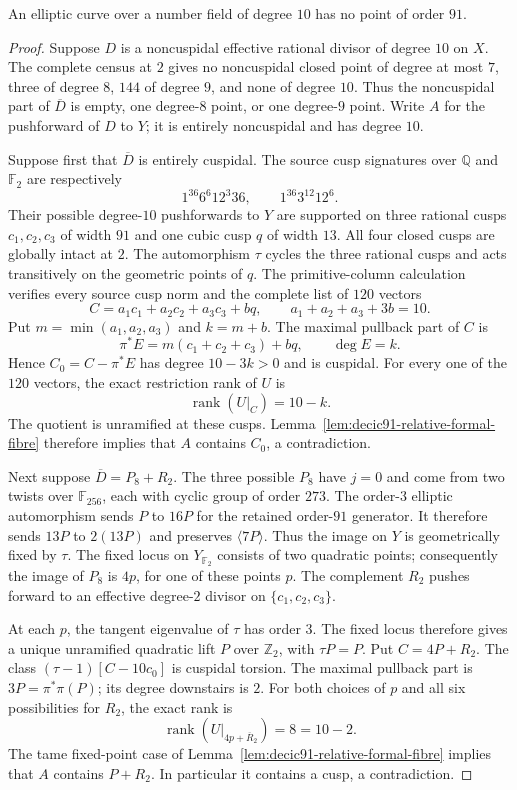 \begin{proposition}\label{prop:decic91-exclusion}
An elliptic curve over a number field of degree $10$ has no point of order $91$.
\end{proposition}
\begin{proof}
Suppose $D$ is a noncuspidal effective rational divisor of degree $10$ on $X$.
The complete census at $2$ gives no noncuspidal closed point of degree at most $7$,
three of degree $8$, $144$ of degree $9$, and none of degree $10$.
Thus the noncuspidal part of $\overline D$ is empty, one degree-$8$ point,
or one degree-$9$ point.
Write $A$ for the pushforward of $D$ to $Y$; it is entirely noncuspidal and has degree $10$.

Suppose first that $\overline D$ is entirely cuspidal.
The source cusp signatures over $\mathbb Q$ and $\mathbb F_2$ are respectively
\[
 1^{36}6^6 12^3 36,
 \qquad 1^{36}3^{12}12^6.
\]
Their possible degree-$10$ pushforwards to $Y$ are supported on three rational
cusps $c_1,c_2,c_3$ of width $91$ and one cubic cusp $q$ of width $13$.
All four closed cusps are globally intact at $2$.
The automorphism $\tau$ cycles the three rational cusps and acts transitively
on the geometric points of $q$.
The primitive-column calculation verifies every source cusp norm and the
complete list of $120$ vectors
\[
 C=a_1c_1+a_2c_2+a_3c_3+bq,
 \qquad a_1+a_2+a_3+3b=10.
\]
Put $m=\min(a_1,a_2,a_3)$ and $k=m+b$.
The maximal pullback part of $C$ is
\[
 \pi^*E=m(c_1+c_2+c_3)+bq,
 \qquad \deg E=k.
\]
Hence $C_0=C-\pi^*E$ has degree $10-3k>0$ and is cuspidal.
For every one of the $120$ vectors, the exact restriction rank of $U$ is
\[
 \operatorname{rank}(U|_C)=10-k.
\]
The quotient is unramified at these cusps. Lemma~\ref{lem:decic91-relative-formal-fibre}
therefore implies that $A$ contains $C_0$, a contradiction.

Next suppose $\overline D=P_8+R_2$.
The three possible $P_8$ have $j=0$ and come from two twists over $\mathbb F_{256}$,
each with cyclic group of order $273$.
The order-$3$ elliptic automorphism sends $P$ to $16P$ for the retained
order-$91$ generator. It therefore sends $13P$ to $2(13P)$ and preserves
$\langle7P\rangle$. Thus the image on $Y$ is geometrically fixed by $\tau$.
The fixed locus on $Y_{\mathbb F_2}$ consists of two quadratic points;
consequently the image of $P_8$ is $4p$, for one of these points $p$.
The complement $R_2$ pushes forward to an effective degree-$2$ divisor
on $\{c_1,c_2,c_3\}$.

At each $p$, the tangent eigenvalue of $\tau$ has order $3$.
The fixed locus therefore gives a unique unramified quadratic lift $P$
over $\mathbb Z_2$, with $\tau P=P$.
Put $C=4P+R_2$. The class $(\tau-1)[C-10c_0]$ is cuspidal torsion.
The maximal pullback part is $3P=\pi^*\pi(P)$; its degree downstairs is $2$.
For both choices of $p$ and all six possibilities for $R_2$, the exact rank is
\[
 \operatorname{rank}(U|_{4p+\overline R_2})=8=10-2.
\]
The tame fixed-point case of Lemma~\ref{lem:decic91-relative-formal-fibre}
implies that $A$ contains $P+R_2$. In particular it contains a cusp, a contradiction.


\end{proof}
